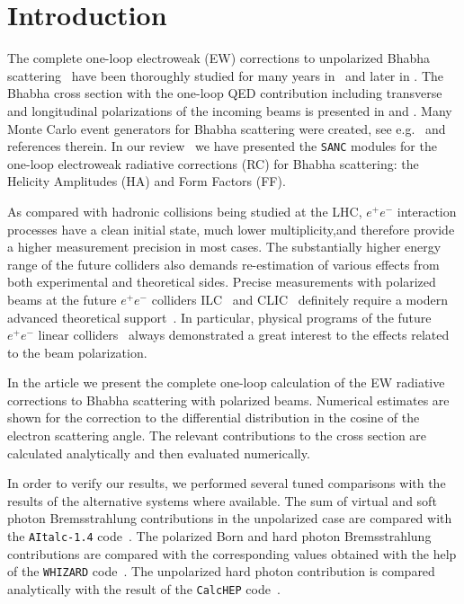 \documentclass[%
 reprint,
amsmath,
amssymb,
 aps,
 prb,
 floatfix,
]{revtex4-1}
\begin{document}
\section{Introduction}
\label{intro}
The complete one-loop electroweak (EW) corrections to unpolarized 
Bhabha scattering~\cite{Bhabha:1936zz} have been thoroughly 
studied for many years in~\cite{Consoli:1979xw} and later in
\cite{Bohm:1984yt,Tobimatsu:1985pp,Bohm:1986fg,Berends:1987jm,Kuroda:1987yi,Bardin:1990xe,Beenakker:1990mb,Beenakker:1990es,Montagna:1993py,Fleischer:2006ht}.
The Bhabha cross section with the  one-loop QED contribution including transverse
and longitudinal polarizations of the incoming beams is presented
in \cite{Hollik:1981bu} and \cite{Hollik:1982wr}. 
Many Monte Carlo event generators for Bhabha scattering were created, see 
e.g.~\cite{Jadach:1996gu} and references therein.
In our review~\cite{Andonov:2004hi} we have presented the {\tt SANC} modules 
for the one-loop electroweak radiative corrections (RC) for Bhabha scattering: 
the Helicity Amplitudes (HA) and Form Factors (FF). 

As compared with hadronic collisions being studied at the LHC, 
$e^{+}e^{-}$ interaction processes have a clean initial state, 
much lower multiplicity,and therefore provide a higher measurement precision
in most cases.
The substantially higher energy range of the future colliders also demands
re-estimation of various effects from both experimental and theoretical sides.  
Precise measurements with polarized beams at the future
$e^ +e^-$ colliders ILC~\cite{homepagesILC} 
and CLIC~\cite{homepagesCLIC} definitely require a modern advanced theoretical 
support~\cite{Khiem:2014cka,Ohl:2006ae,CarloniCalame:2015zev,Riemann:2015zbi}.
In particular, physical programs of the future $e^{+} e^{-}$ linear 
colliders~\cite{Accomando:1997wt,Battaglia:2004mw,Moortgat-Picka:2015yla} 
always demonstrated a great interest to the effects related
to the beam polarization.
 
In the article we present the complete one-loop calculation of 
the EW radiative corrections to Bhabha scattering with polarized beams.
Numerical estimates are shown for the correction 
to the differential distribution in the cosine of the electron scattering 
angle. The relevant contributions to the cross section are calculated 
analytically and then evaluated numerically.

In order to verify our results, we performed several tuned comparisons  
with the results of the alternative systems where available.
The sum of virtual and soft photon Bremsstrahlung contributions 
in the unpolarized case are compared with the {\tt AItalc-1.4} code~\cite{Fleischer:2006ht}.
The polarized Born and hard photon Bremsstrahlung contributions are compared
with the corresponding values obtained with the help of the {\tt WHIZARD} 
code~\cite{Ohl:2006ae,Kilian:2007gr,Kilian:2014nya}.
The unpolarized hard photon contribution is compared analytically
with the result of the {\tt CalcHEP} code~\cite{Belyaev:2012qa}.
\end{document}
